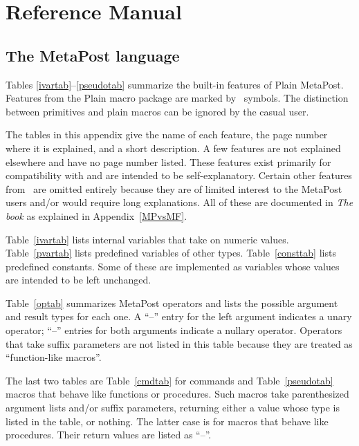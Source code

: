 \section{Reference Manual}
\label{refman}

\begingroup
\renewcommand\topfraction{1.0}%
\renewcommand\textfraction{0.0}
\setcounter{topnumber}{10}
\setcounter{totalnumber}{10}

\subsection{The MetaPost language}
\label{refman:lang}

Tables \ref{ivartab}--\ref{pseudotab} summarize the built-in features of
Plain MetaPost.  Features from the Plain macro
package are marked by \pl\ symbols.  The distinction between primitives
and plain macros can be ignored by the casual user.

The tables in this appendix give the name of each feature, the page
number where it is explained, and a short description.  A few features
are not explained elsewhere and have no page number listed.  These
features exist primarily for compatibility with \MF{}
and are intended to be self-explanatory.  Certain other features from
\MF\ are omitted entirely because they are of limited interest to the
MetaPost users and/or would require long explanations.  All of these are
documented in {\sl The \MF book} \cite{kn:c} as explained in
Appendix~\ref{MPvsMF}.

Table~\ref{ivartab} lists internal variables that take on numeric values.
Table~\ref{pvartab} lists predefined variables of other types.
Table~\ref{consttab} lists predefined constants.  Some of these are implemented
as variables whose values are intended to be left unchanged.

Table~\ref{optab} summarizes MetaPost operators and lists
the possible argument and result types for each one.  A ``--'' entry for
the left argument indicates a unary operator; ``--'' entries for both
arguments indicate a nullary operator.  Operators that take suffix
parameters are not listed in this table because they are treated as
``function-like macros''.

The last two tables are Table~\ref{cmdtab} for commands and
Table~\ref{pseudotab} macros that behave like functions or procedures.
Such macros take parenthesized argument lists and/or suffix parameters,
returning either a value whose type is listed in the table, or nothing.
The latter case is for macros that behave like procedures.  Their return
values are listed as ``--''.

